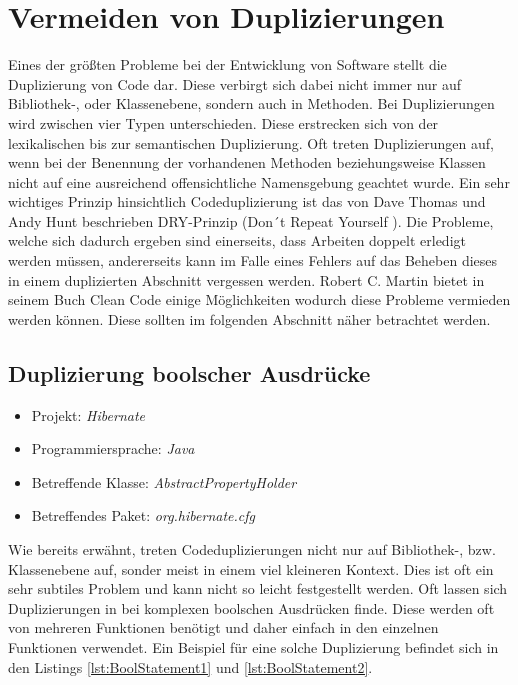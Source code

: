 \section{Vermeiden von Duplizierungen}
Eines der größten Probleme bei der Entwicklung von Software stellt die Duplizierung von Code dar. Diese verbirgt sich dabei nicht immer nur auf Bibliothek-, oder Klassenebene, sondern auch in Methoden. Bei Duplizierungen wird zwischen vier Typen unterschieden. Diese erstrecken sich von der lexikalischen bis zur semantischen Duplizierung. Oft treten Duplizierungen auf, wenn bei der Benennung der vorhandenen Methoden beziehungsweise Klassen nicht auf eine ausreichend offensichtliche Namensgebung geachtet wurde. Ein sehr wichtiges Prinzip hinsichtlich Codeduplizierung ist das von Dave Thomas und Andy Hunt beschrieben DRY-Prinzip (Don´t Repeat Yourself \cite{Hunt1999}).
Die Probleme, welche sich dadurch ergeben sind einerseits, dass Arbeiten doppelt erledigt werden müssen, andererseits kann im Falle eines Fehlers auf das Beheben dieses in einem duplizierten Abschnitt vergessen werden. Robert C. Martin bietet in seinem Buch Clean Code einige Möglichkeiten wodurch diese Probleme vermieden werden können. Diese sollten im folgenden Abschnitt näher betrachtet werden.

\subsection{Duplizierung boolscher Ausdrücke}
\label{cha:BadBoolStatements}
\begin{itemize}
	\item Projekt: \textit{Hibernate}
	\item Programmiersprache: \textit{Java}
	\item Betreffende Klasse: \textit{AbstractPropertyHolder}
	\item Betreffendes Paket: \textit{org.hibernate.cfg}
\end{itemize}

\SuperPar Wie bereits erwähnt, treten Codeduplizierungen nicht nur auf Bibliothek-, bzw. Klassenebene auf, sonder meist in einem viel kleineren Kontext. Dies ist oft ein sehr subtiles Problem und kann nicht so leicht festgestellt werden. Oft lassen sich Duplizierungen in bei komplexen boolschen Ausdrücken finde. Diese werden oft von mehreren Funktionen benötigt und daher einfach in den einzelnen Funktionen verwendet. Ein Beispiel für eine solche Duplizierung befindet sich in den Listings \ref{lst:BoolStatement1} und  \ref{lst:BoolStatement2}.

